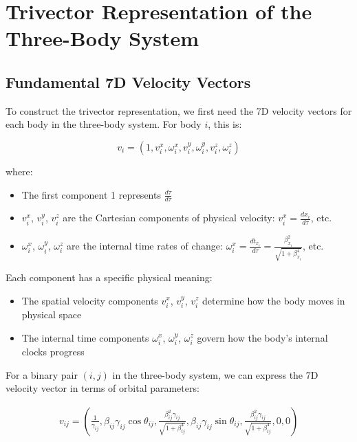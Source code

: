\documentclass{article}
\begin{document}
\section{Trivector Representation of the Three-Body System}

\subsection{Fundamental 7D Velocity Vectors}

To construct the trivector representation, we first need the 7D velocity vectors for each body in the three-body system. For body $i$, this is:

\begin{equation}
v_i = \left(1, v_i^x, \omega_i^x, v_i^y, \omega_i^y, v_i^z, \omega_i^z\right)
\end{equation}

where:
\begin{itemize}
\item The first component 1 represents $\frac{d\tau}{d\tau}$
\item $v_i^x$, $v_i^y$, $v_i^z$ are the Cartesian components of physical velocity: $v_i^x = \frac{dx_i}{d\tau}$, etc.
\item $\omega_i^x$, $\omega_i^y$, $\omega_i^z$ are the internal time rates of change: $\omega_i^x = \frac{dt_{x_i}}{d\tau} = \frac{\beta_{x_i}^2}{\sqrt{1+\beta_{x_i}^4}}$, etc.
\end{itemize}

Each component has a specific physical meaning:
\begin{itemize}
\item The spatial velocity components $v_i^x$, $v_i^y$, $v_i^z$ determine how the body moves in physical space
\item The internal time components $\omega_i^x$, $\omega_i^y$, $\omega_i^z$ govern how the body's internal clocks progress
\end{itemize}

For a binary pair $(i,j)$ in the three-body system, we can express the 7D velocity vector in terms of orbital parameters:

\begin{align}
v_{ij} = \left(\frac{1}{\gamma_{ij}}, \beta_{ij}\gamma_{ij}\cos\theta_{ij}, \frac{\beta_{ij}^2\gamma_{ij}}{\sqrt{1+\beta_{ij}^4}}, \beta_{ij}\gamma_{ij}\sin\theta_{ij}, \frac{\beta_{ij}^2\gamma_{ij}}{\sqrt{1+\beta_{ij}^4}}, 0, 0\right)
\end{align}
\end{document}
